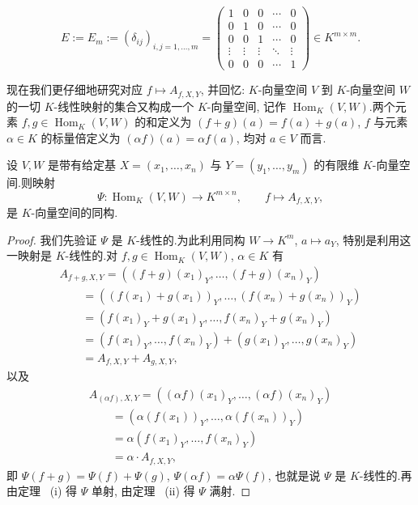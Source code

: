 \[
E := E_m := (\delta_{ij})_{i, j = 1, \ldots, m} =
\begin{pmatrix}
1 & 0 & 0 & \cdots & 0 \\
0 & 1 & 0 & \cdots & 0 \\
0 & 0 & 1 & \cdots & 0 \\
\vdots & \vdots & \vdots & \ddots & \vdots \\
0 & 0 & 0 & \cdots & 1
\end{pmatrix} \in K^{m \times m}\text{.}
\]

现在我们更仔细地研究对应 $f \longmapsto A_{f, X, Y}$, 并回忆: $K$-向量空间 $V$ 到 $K$-向量空间 $W$ 的一切 $K$-线性映射的集合又构成一个 $K$-向量空间, 记作 $\operatorname{Hom}_K(V, W)$.两个元素 $f, g \in \operatorname{Hom}_K(V, W)$ 的和定义为 $(f + g)(a) = f(a) + g(a)$, $f$ 与元素 $\alpha \in K$ 的标量倍定义为 $(\alpha f)(a) = \alpha f(a)$, 均对 $a \in V$ 而言.

\begin{theorem}\label{thm:3.1.4}
设 $V, W$ 是带有给定基 $X = (x_1, \ldots, x_n)$ 与 $Y = (y_1, \ldots, y_m)$ 的有限维 $K$-向量空间.则映射
\[
\varPsi \colon \operatorname{Hom}_K(V, W) \longrightarrow K^{m \times n}, \qquad f \longmapsto A_{f, X, Y},
\]
是 $K$-向量空间的同构.
\end{theorem}

\begin{proof}
我们先验证 $\varPsi$ 是 $K$-线性的.为此利用同构 $W \longrightarrow K^m$, $a \longmapsto a_Y$, 特别是利用这一映射是 $K$-线性的.对 $f, g \in \operatorname{Hom}_K(V, W)$, $\alpha \in K$ 有
\[
\begin{array}{l}
A_{f + g, X, Y} = \left((f + g)(x_1)_Y, \ldots, (f + g)(x_n)_Y\right) \\
\qquad = \left(\left(f(x_1) + g(x_1)\right)_Y, \ldots, \left(f(x_n) + g(x_n)\right)_Y\right) \\
\qquad = \left(f(x_1)_Y + g(x_1)_Y, \ldots, f(x_n)_Y + g(x_n)_Y\right) \\
\qquad = \left(f(x_1)_Y, \ldots, f(x_n)_Y\right) + \left(g(x_1)_Y, \ldots, g(x_n)_Y\right) \\
\qquad = A_{f, X, Y} + A_{g, X, Y},
\end{array}
\]
以及
\[
\begin{array}{l}
A_{(\alpha f), X, Y} = \left((\alpha f)(x_1)_Y, \ldots, (\alpha f)(x_n)_Y\right) \\
\qquad = \left(\alpha\left(f(x_1)\right)_Y, \ldots, \alpha\left(f(x_n)\right)_Y\right) \\
\qquad = \alpha\left(f(x_1)_Y, \ldots, f(x_n)_Y\right) \\
\qquad = \alpha \cdot A_{f, X, Y},
\end{array}
\]
即 $\varPsi(f + g) = \varPsi(f) + \varPsi(g)$, $\varPsi(\alpha f) = \alpha\varPsi(f)$, 也就是说 $\varPsi$ 是 $K$-线性的.再由定理~ (i) 得 $\varPsi$ 单射, 由定理~ (ii) 得 $\varPsi$ 满射.
\end{proof}

